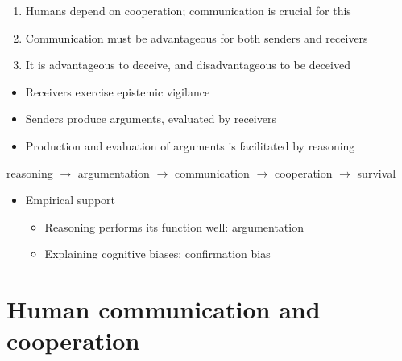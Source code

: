 \documentclass[xcolor=table]{beamer}       %
\begin{document}
\begin{frame}{\insertsection}
    \begin{block}{\citet{MS11}}
    \begin{enumerate}
        \item Humans depend on cooperation; communication is crucial for this
        \item Communication must be advantageous for both senders and receivers
        \item It is advantageous to deceive, and disadvantageous to be deceived
    \end{enumerate}
    \pause
    \begin{itemize}
        \item Receivers exercise epistemic vigilance
        \item Senders produce arguments, evaluated by receivers
        \item Production and evaluation of arguments is facilitated by \alert{reasoning}
    \end{itemize}
    \end{block}
    \centering
    \pause reasoning
    \pause $\to$ argumentation
    \pause $\to$ communication
    \pause $\to$ cooperation
    \pause $\to$ survival
    \pause
    \medskip
    \begin{itemize}
        \item Empirical support
            \begin{itemize}
                \item Reasoning performs its function well: argumentation
                \item Explaining cognitive biases: confirmation bias
            \end{itemize}
    \end{itemize}
\end{frame}

\section{Human communication and cooperation}
\end{document}
